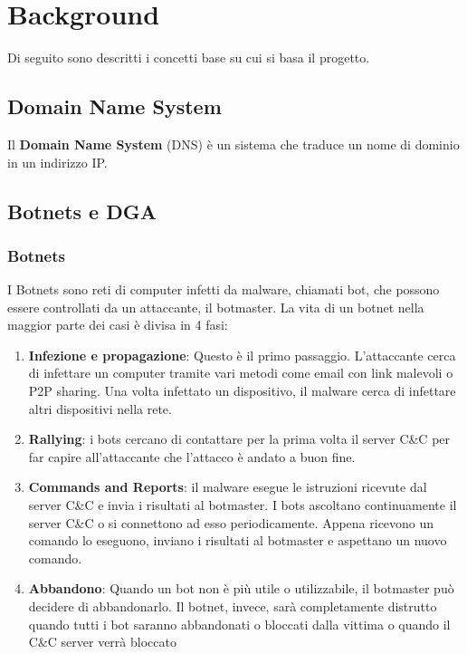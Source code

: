 \documentclass[12pt,a4paper,openright,twoside]{book}
\begin{document}

\chapter{Background}

Di seguito sono descritti i concetti base su cui si basa il progetto.

\section{Domain Name System}
Il \textbf{Domain Name System} (DNS) è un sistema che
traduce un nome di dominio in un indirizzo IP.



\section{Botnets e DGA}

\subsection{Botnets}

I Botnets sono reti di computer infetti da malware, chiamati bot,
che possono essere controllati da un attaccante, il botmaster.
La vita di un botnet nella maggior parte dei casi è divisa in 4 fasi:
\begin{enumerate}
    \item \textbf{Infezione e propagazione}: Questo è il primo
    passaggio. L'attaccante cerca di infettare un computer
    tramite vari metodi come email con link malevoli o \acrfull{P2P} sharing.
    Una volta infettato un dispositivo, il malware cerca di infettare
    altri dispositivi nella rete.

    \item \textbf{Rallying}: i bots cercano di contattare per la prima volta
    il server \acrshort{C&C} per far capire all'attaccante
    che l'attacco è andato a buon fine.

    \item \textbf{Commands and Reports}: il malware esegue le istruzioni
    ricevute dal server \acrshort{C&C} e invia i risultati al botmaster.
    I bots ascoltano continuamente il server \acrshort{C&C} 
    o si connettono ad esso periodicamente. Appena ricevono
    un comando lo eseguono, inviano i risultati al botmaster
    e aspettano un nuovo comando.

    \item \textbf{Abbandono}: Quando un bot non è più utile o utilizzabile,
    il botmaster può decidere di abbandonarlo. Il botnet, invece,
    sarà completamente distrutto quando tutti i bot saranno
    abbandonati o bloccati dalla vittima o quando il \acrshort{C&C} server
    verrà bloccato


\end{enumerate}
\end{document}
